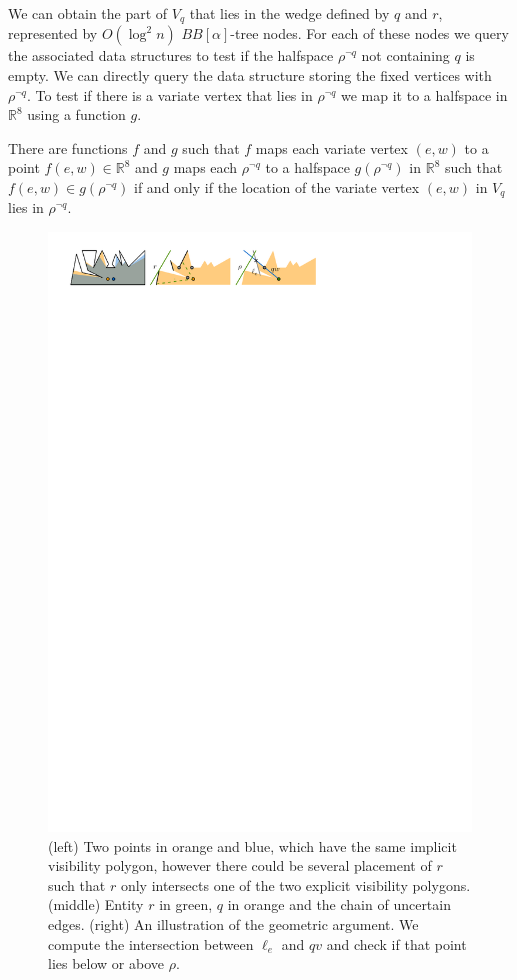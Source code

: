 \documentclass[UKenglish]{lipics-v2019}
\newcommand{\mkmbb}[1]{\ensuremath{\mathbb{#1}}\xspace}
\newcommand{\R}{\mkmbb{R}}
\begin{document}
We can obtain the part of $V_q$ that lies in the wedge defined by $q$ and $r$,
represented by $O(\log^2 n)$ $BB[\alpha]$-tree nodes. For each of these nodes
we query the associated data structures to test if the halfspace $\rho^{\neg q}$ not
containing $q$ is empty. We can directly query the data structure storing the
fixed vertices with $\rho^{\neg q}$. To test if there is a variate vertex that lies in
$\rho^{\neg q}$ we map it to a halfspace in $\R^8$ using a function $g$.

\begin{lemma}
  \label{lem:query_static}
  There are functions $f$ and $g$ such that $f$ maps each variate vertex
  $(e,w)$ to a point $f(e,w) \in \R^8$ and $g$ maps each $\rho^{\neg q}$ to a
  halfspace $g(\rho^{\neg q})$ in $\R^8$ such that $f(e,w) \in g(\rho^{\neg q})$ if and only
  if the location of the variate vertex $(e,w)$ in $V_q$ lies in $\rho^{\neg q}$.
\end{lemma}

  \begin{figure}[h]
    \centering
    \includegraphics[]{../pointline}
    \caption{ (left) Two points in orange and blue, which have the same implicit visibility polygon, however there could be several placement of $r$ such that $r$ only intersects one of the two explicit visibility polygons. (middle) Entity $r$ in green, $q$ in orange and the chain of uncertain edges. (right) An illustration of the geometric argument. We compute the intersection between $\ell_e$ and $qv$ and check if that point lies below or above $\rho$.}
    \label{fig:pointline}
\end{figure}
\end{document}
